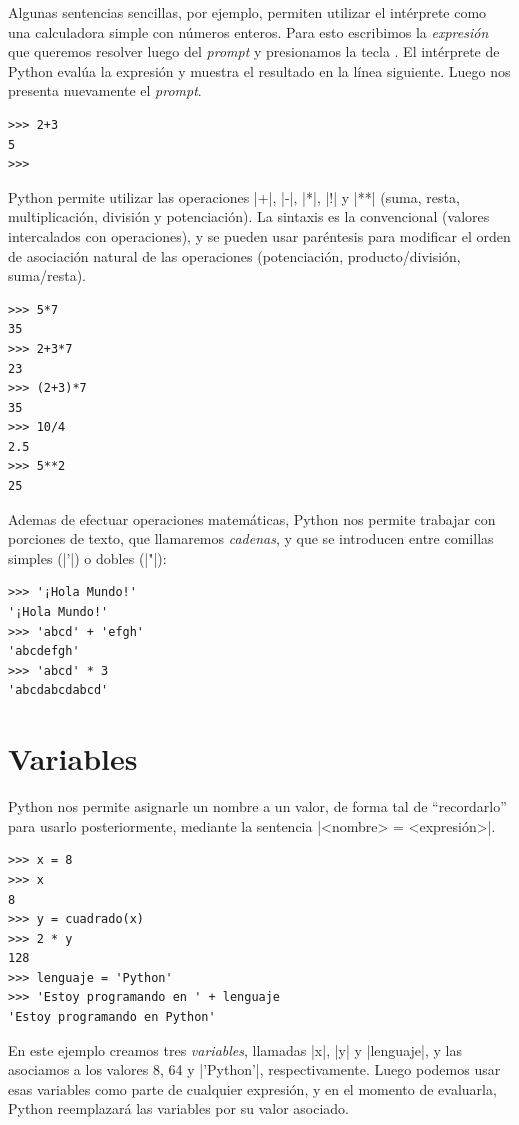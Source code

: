 Algunas sentencias sencillas, por ejemplo, permiten utilizar el intérprete como
una calculadora simple con números enteros. Para esto escribimos la {\it
expresión} que queremos resolver luego del {\it prompt} y presionamos la tecla
. El intérprete de Python evalúa la expresión y muestra el
resultado en la línea siguiente. Luego nos presenta nuevamente el {\it prompt}.

\begin{lstlisting}[numbers=none]
>>> 2+3
5
>>>
\end{lstlisting}

Python permite utilizar las operaciones |+|, |-|, |*|, |!| y |**|
(suma, resta, multiplicación, división y potenciación). La sintaxis es la
convencional (valores intercalados con operaciones), y se pueden usar
paréntesis para modificar el orden de asociación natural de las operaciones
(potenciación, producto/división, suma/resta).

\begin{lstlisting}[numbers=none]
>>> 5*7
35
>>> 2+3*7
23
>>> (2+3)*7
35
>>> 10/4
2.5
>>> 5**2
25
\end{lstlisting}

Ademas de efectuar operaciones matemáticas, Python nos permite trabajar con
porciones de texto, que llamaremos {\it cadenas}, y que se introducen entre
comillas simples (|'|) o dobles (|"|):

\begin{lstlisting}[numbers=none]
>>> '¡Hola Mundo!'
'¡Hola Mundo!'
>>> 'abcd' + 'efgh'
'abcdefgh'
>>> 'abcd' * 3
'abcdabcdabcd'
\end{lstlisting}

\section{Variables}

Python nos permite asignarle un nombre a un valor, de forma tal de
``recordarlo'' para usarlo posteriormente, mediante la sentencia
|<nombre> = <expresión>|.

\begin{lstlisting}[numbers=none]
>>> x = 8
>>> x
8
>>> y = cuadrado(x)
>>> 2 * y
128
>>> lenguaje = 'Python'
>>> 'Estoy programando en ' + lenguaje
'Estoy programando en Python'
\end{lstlisting}

En este ejemplo creamos tres {\it variables}, llamadas |x|, |y| y |lenguaje|, y
las asociamos a los valores 8, 64 y |'Python'|, respectivamente. Luego podemos
usar esas variables como parte de cualquier expresión, y en el momento de
evaluarla, Python reemplazará las variables por su valor asociado.

